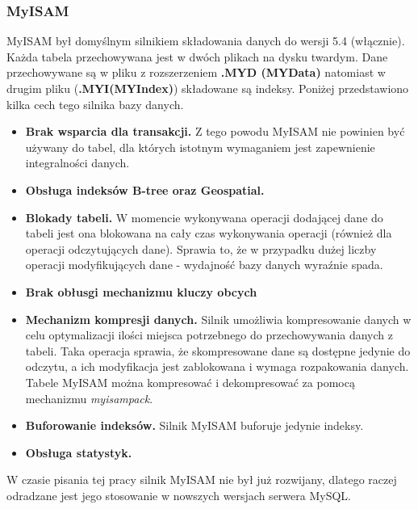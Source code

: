 \subsubsection{MyISAM}
MyISAM był domyślnym silnikiem składowania danych do wersji 5.4 (włącznie). Każda tabela przechowywana jest w dwóch plikach na dysku twardym. Dane przechowywane są w pliku z rozszerzeniem \textbf{.MYD (MYData)}
natomiast w drugim pliku (\textbf{.MYI(MYIndex)}) składowane są indeksy. Poniżej przedstawiono kilka cech tego silnika bazy danych. 
\begin{itemize}
	\item \textbf{Brak wsparcia dla transakcji.} Z tego powodu MyISAM nie powinien być używany do tabel, dla których istotnym wymaganiem jest zapewnienie integralności danych.
	\item \textbf{Obsługa indeksów B-tree oraz Geospatial.}
	\item \textbf{Blokady tabeli.}  W momencie wykonywana operacji dodającej dane do tabeli jest ona blokowana na cały czas wykonywania operacji (również dla operacji odczytujących dane). Sprawia to, że w przypadku dużej liczby operacji modyfikujących dane - wydajność bazy danych wyraźnie spada.
	\item \textbf{Brak obłusgi mechanizmu kluczy obcych}
	\item \textbf{Mechanizm kompresji danych.} Silnik umożliwia kompresowanie danych w celu optymalizacji ilości miejsca potrzebnego do przechowywania danych z tabeli. Taka operacja sprawia, że skompresowane dane są dostępne jedynie do odczytu, a ich modyfikacja jest zablokowana i wymaga rozpakowania danych. Tabele MyISAM można kompresować i dekompresować za pomocą mechanizmu \textit{myisampack}.
	\item \textbf{Buforowanie indeksów.} Silnik MyISAM buforuje jedynie indeksy.
	\item \textbf{Obsługa statystyk.}
\end{itemize}

W czasie pisania tej pracy silnik MyISAM nie był już rozwijany, dlatego raczej odradzane jest jego stosowanie w nowszych wersjach serwera MySQL. 

